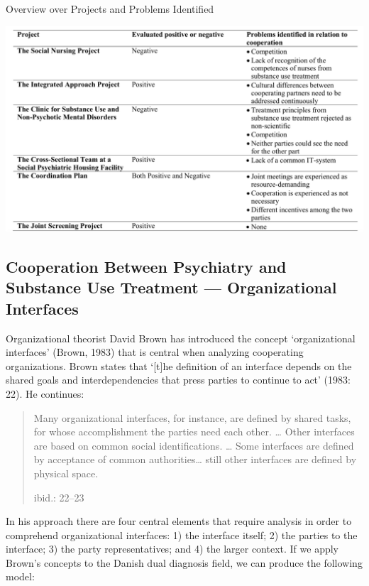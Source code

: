 \FloatBarrier
\noindent
\begin{table}[htb]
\centering
\caption{Overview over Projects and Problems Identified}
\includegraphics[width=0.9\linewidth]{paper6/p6_data/p6_tab1.png}
\label{tab:1}
\end{table}
\FloatBarrier
    \begin{multicols}{2}
\section{Cooperation Between Psychiatry and Substance Use Treatment --- Organizational Interfaces}
Organizational theorist David Brown has introduced the concept ‘organizational interfaces’ (Brown, 1983) that is central when analyzing cooperating organizations.%
Brown states that ‘[t]he definition of an interface depends on the shared goals and interdependencies that press parties to continue to act’ (1983: 22). He continues: 
    \blockquote[ibid.: 22--23]{Many organizational interfaces, for instance, are defined by shared tasks, for whose accomplishment the parties need each other. … Other interfaces are based on common social identifications. … Some interfaces are defined by acceptance of common authorities… still other interfaces are defined by physical space.}
In his approach there are four central elements that require analysis in order to comprehend organizational interfaces: 1) the interface itself; 2) the parties to the interface; 3) the party representatives; and 4) the larger context. If we apply Brown’s concepts to the Danish dual diagnosis field, we can produce the following model:
    \end{multicols}
